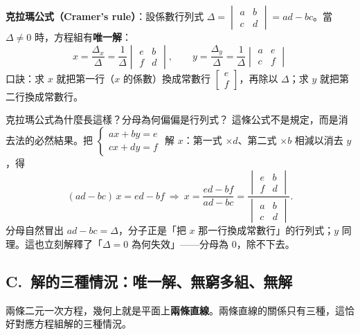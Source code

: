 \documentclass[11pt]{article}
\begin{document}
\textbf{克拉瑪公式（Cramer's rule）}：設係數行列式 $\Delta=\begin{vmatrix} a & b\\ c & d \end{vmatrix}=ad-bc$。當 $\Delta\ne0$ 時，方程組有\textbf{唯一解}：
$$\boxed{\;x=\frac{\Delta_x}{\Delta}=\frac{1}{\Delta}\begin{vmatrix} e & b\\ f & d \end{vmatrix},\qquad y=\frac{\Delta_y}{\Delta}=\frac{1}{\Delta}\begin{vmatrix} a & e\\ c & f \end{vmatrix}\;}$$
口訣：求 $x$ 就把第一行（$x$ 的係數）換成常數行 $\begin{bmatrix} e\\ f \end{bmatrix}$，再除以 $\Delta$；求 $y$ 就把第二行換成常數行。

\begin{補充框}{克拉瑪公式為什麼長這樣？分母為何偏偏是行列式？}
這條公式不是規定，而是消去法的必然結果。把 $\begin{cases} ax+by=e\\ cx+dy=f \end{cases}$ 解 $x$：第一式 $\times d$、第二式 $\times b$ 相減以消去 $y$，得
$$(ad-bc)\,x=ed-bf\ \Longrightarrow\ x=\frac{ed-bf}{ad-bc}=\frac{\begin{vmatrix} e & b\\ f & d \end{vmatrix}}{\begin{vmatrix} a & b\\ c & d \end{vmatrix}}.$$
分母自然冒出 $ad-bc=\Delta$，分子正是「把 $x$ 那一行換成常數行」的行列式；$y$ 同理。這也立刻解釋了「$\Delta=0$ 為何失效」——分母為 $0$，除不下去。
\end{補充框}

\subsection*{\sffamily C.\ 解的三種情況：唯一解、無窮多組、無解}

兩條二元一次方程，幾何上就是平面上\textbf{兩條直線}。兩條直線的關係只有三種，這恰好對應方程組解的三種情況。

\end{document}
